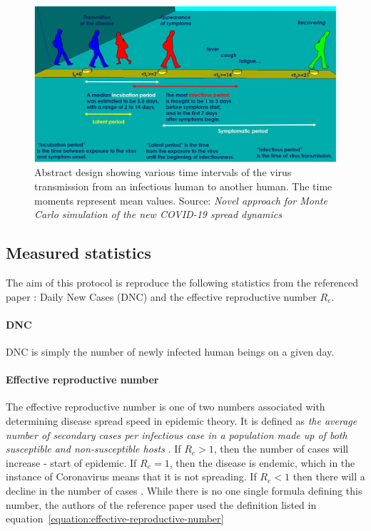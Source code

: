 \documentclass[a4paper]{article}
\begin{document}
\begin{figure}[h!]
	\centering
	\includegraphics{images/covid19_spread_dynamics.jpg}
	\caption{Abstract design showing various time intervals of the virus transmission from an infectious human to another human. The time moments represent mean values. Source: \textit{Novel approach for Monte Carlo simulation of the new COVID-19 spread dynamics} \cite{Maltezos2021}}
	\label{figure:covid-spread-dynamics}
\end{figure}



\subsection{Measured statistics}
The aim of this protocol is reproduce the following statistics from the referenced paper \cite{Maltezos2021}: Daily New Cases (DNC) and the effective reproductive number $R_e$.

\paragraph{DNC}
DNC is simply the number of newly infected human beings on a given day.

\paragraph{Effective reproductive number}
The effective reproductive number is one of two numbers associated with determining disease spread speed in epidemic theory. It is defined as \textit{the average number of secondary cases per infectious case in a population made up of both susceptible and non-susceptible hosts} \cite{Barratt2018}. If $R_e > 1$, then the number of cases will increase - start of epidemic. If $R_e = 1$, then the disease is endemic, which in the instance of Coronavirus means that it is not spreading. If $R_e < 1$ then there will a decline in the number of cases \cite{Barratt2018}. While there is no one single formula defining this number, the authors of the reference paper \cite{Maltezos2021} used the definition listed in equation~\ref{equation:effective-reproductive-number}
\end{document}
